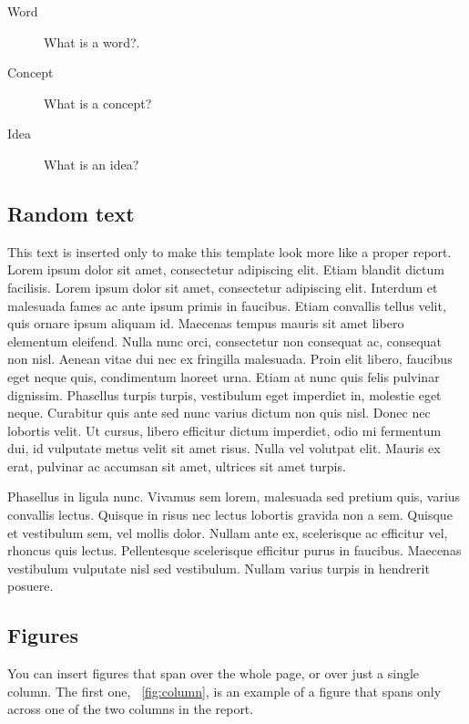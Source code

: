 \documentclass[fleqn,moreauthors,10pt]{ds_report}
\begin{document}
\begin{description}
	\item[Word] What is a word?.
	\item[Concept] What is a concept?
	\item[Idea] What is an idea?
\end{description}


\subsection*{Random text}

This text is inserted only to make this template look more like a proper report. Lorem ipsum dolor sit amet, consectetur adipiscing elit. Etiam blandit dictum facilisis. Lorem ipsum dolor sit amet, consectetur adipiscing elit. Interdum et malesuada fames ac ante ipsum primis in faucibus. Etiam convallis tellus velit, quis ornare ipsum aliquam id. Maecenas tempus mauris sit amet libero elementum eleifend. Nulla nunc orci, consectetur non consequat ac, consequat non nisl. Aenean vitae dui nec ex fringilla malesuada. Proin elit libero, faucibus eget neque quis, condimentum laoreet urna. Etiam at nunc quis felis pulvinar dignissim. Phasellus turpis turpis, vestibulum eget imperdiet in, molestie eget neque. Curabitur quis ante sed nunc varius dictum non quis nisl. Donec nec lobortis velit. Ut cursus, libero efficitur dictum imperdiet, odio mi fermentum dui, id vulputate metus velit sit amet risus. Nulla vel volutpat elit. Mauris ex erat, pulvinar ac accumsan sit amet, ultrices sit amet turpis.

Phasellus in ligula nunc. Vivamus sem lorem, malesuada sed pretium quis, varius convallis lectus. Quisque in risus nec lectus lobortis gravida non a sem. Quisque et vestibulum sem, vel mollis dolor. Nullam ante ex, scelerisque ac efficitur vel, rhoncus quis lectus. Pellentesque scelerisque efficitur purus in faucibus. Maecenas vestibulum vulputate nisl sed vestibulum. Nullam varius turpis in hendrerit posuere.


\subsection*{Figures}

You can insert figures that span over the whole page, or over just a single column. The first one, \figurename~\ref{fig:column}, is an example of a figure that spans only across one of the two columns in the report.
\end{document}
